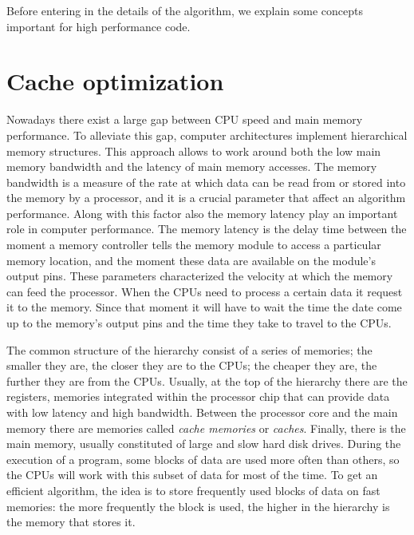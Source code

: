 Before entering in the details of the algorithm, we explain some concepts important for high performance code.

\section{Cache optimization}
Nowadays there exist a large gap between CPU speed and main memory performance. To alleviate this gap, computer architectures implement hierarchical memory structures. This approach allows to work around both the low main memory bandwidth and the latency of main memory accesses.
The memory bandwidth is a measure of the rate at which data can be read from or stored into the memory by a processor, and it is a crucial parameter that affect an algorithm performance. Along with this factor also the memory latency play an important role in computer performance. The memory latency is the delay time between the moment a memory controller tells the memory module to access a particular memory location, and the moment these data are available on the module's output pins. These parameters characterized the velocity at which the memory can feed the processor. When the CPUs need to process a certain data it request it to the memory. Since that moment it will have to wait the time the date come up to the memory's output pins and the time they take to travel to the CPUs.
 
  The common structure of the hierarchy consist of a series of memories; the smaller they are, the closer they are to the CPUs; the cheaper they are, the further they are from the CPUs. Usually, at the top of the hierarchy there are the registers, memories integrated within the processor chip that can provide data with low latency and high bandwidth. Between the processor core and the main memory there are memories called \emph{cache memories} or \emph{caches}. Finally, there is the main memory, usually constituted of large and slow hard disk drives. During the execution of a program, some blocks of data are used more often than others, so the CPUs will work with this subset of data for most of the time. To get an efficient algorithm, the idea is to store frequently used blocks of data on fast memories: the more frequently the block is used, the higher in the hierarchy is the memory that stores it. 


